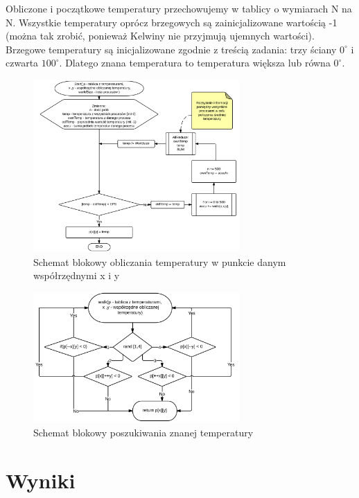 \documentclass[11pt,a4paper]{article}
\begin{document}
Obliczone i początkowe temperatury przechowujemy w tablicy o wymiarach N na N. Wszystkie temperatury oprócz brzegowych są zainicjalizowane wartością -1 (można tak zrobić, ponieważ Kelwiny nie przyjmują ujemnych wartości). Brzegowe temperatury są inicjalizowane zgodnie z treścią zadania: trzy ściany $0^{\circ}$ i czwarta $100^{\circ}$. Dlatego znana temperatura to temperatura większa lub równa $0^{\circ}$.

\begin{figure}[H]
\begin{center}
\includegraphics[width=0.7\textwidth]{schemat1.png}
\caption{Schemat blokowy obliczania temperatury w punkcie danym współrzędnymi x i y}
\end{center}
\end{figure}

\begin{figure}[H]
\begin{center}
\includegraphics[width=0.7\textwidth]{schemat2.png}
\caption{Schemat blokowy poszukiwania znanej temperatury}
\end{center}
\end{figure}

\section{Wyniki}
\end{document}
